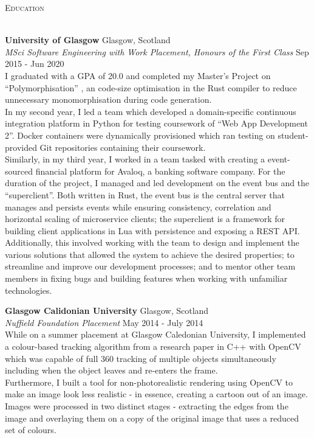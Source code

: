 \documentclass[a4paper]{article}
\newcommand{\lineunder} {
  \vspace*{-8pt} \\
  \hspace*{-18pt} \hrulefill \\
}
\newcommand{\header} [1] {
  {\hspace*{-18pt}\vspace*{6pt} \textsc{#1}}
  \vspace*{-6pt} \lineunder
}
\begin{document}
\header{Education}
\vspace{1mm}

\textbf{University of Glasgow} \hfill {\color{gray} Glasgow, Scotland} \\
\textit{MSci Software Engineering with Work Placement, Honours of the First Class} \hfill {\color{gray} Sep 2015 - Jun 2020} \\
\vspace{2mm}
I graduated with a GPA of 20.0 and completed my Master's Project on ``Polymorphisation''
\footnotemark[1], an code-size optimisation in the Rust compiler to reduce unnecessary
monomorphisation during code generation. \\
\vspace{2mm}
In my second year, I led a team which developed a domain-specific continuous integration platform
in Python for testing coursework of ``Web App Development 2''. Docker containers were dynamically
provisioned which ran testing on student-provided Git repositories containing their coursework. \\
\vspace{2mm}
Similarly, in my third year, I worked in a team tasked with creating a event-sourced financial
platform \footnotemark[2] \footnotemark[3] for Avaloq, a banking software company. For the duration
of the project, I managed and led development on the event bus and the ``superclient''. Both written
in Rust, the event bus is the central server that manages and persists events while ensuring
consistency, correlation and horizontal scaling of microservice clients; the superclient is a
framework for building client applications in Lua with persistence and exposing a REST API. \\
\vspace{2mm}
Additionally, this involved working with the team to design and implement the various solutions that
allowed the system to achieve the desired properties; to streamline and improve our development
processes; and to mentor other team members in fixing bugs and building features when working with
unfamiliar technologies.
\vspace{2mm}

\textbf{Glasgow Calidonian University} \hfill {\color{gray} Glasgow, Scotland} \\
\textit{Nuffield Foundation Placement} \hfill {\color{gray} May 2014 - July 2014} \\
\vspace{2mm}
While on a summer placement at Glasgow Caledonian University, I implemented a colour-based
tracking algorithm from a research paper in C++ with OpenCV \footnotemark[4] \footnotemark[5] which
was capable of full 360 tracking of multiple objects simultaneously including when the object
leaves and re-enters the frame. \\
\vspace{2mm}
Furthermore, I built a tool for non-photorealistic rendering using OpenCV to make an image look
less realistic - in essence, creating a cartoon out of an image. Images were processed in two
distinct stages - extracting the edges from the image and overlaying them on a copy of the
original image that uses a reduced set of colours.
\vspace{2mm}
\end{document}
